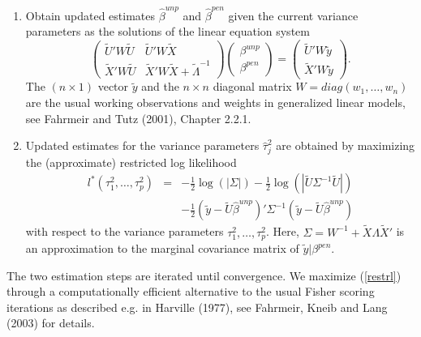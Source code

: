 \documentclass[11pt,a4paper,twoside]{bayesxarticle}
\begin{document}
\begin{enumerate}
\item Obtain updated estimates $\hat{\beta}^{unp}$ and $\hat{\beta}^{pen}$ given the current variance parameters
as the solutions of the linear equation system
\begin{equation}
\label{equsystem} \left(
\begin{array}{ll}
\tilde{U}' W  \tilde{U} & \tilde{U}' W  \tilde{X} \\
\tilde{X}' W  \tilde{U} & \tilde{X}' W  \tilde{X} +
\tilde{\Lambda}^{-1}
\end{array}
\right) \left(
\begin{array}{l}
\beta^{unp} \\
\beta^{pen}
\end{array}
\right) = \left(
\begin{array}{l}
\tilde{U}'W \tilde{y} \\
\tilde{X}'W \tilde{y}
\end{array}
\right).
\end{equation}
The $(n \times 1)$ vector $\tilde{y}$ and the $n \times n$
diagonal matrix $W = diag(w_1,\dots,w_n)$ are the usual working
observations and weights in generalized linear models, see
Fahrmeir and Tutz (2001), Chapter 2.2.1.
\item Updated estimates for the variance parameters $\hat{\tau}_j^2$ are obtained by maximizing
the (approximate) restricted log likelihood
\begin{equation}
\label{restrl}
\begin{array}{lll}
l^{\ast}(\tau^2_1,\dots,\tau^2_p) & = & -\frac{1}{2}
\log(|\Sigma|) - \frac{1}{2} \log(|\tilde{U} \Sigma^{-1}
\tilde{U}|) \\ [0.3cm] & & - \frac{1}{2} (\tilde{y} - \tilde{U}
\hat{\beta}^{unp})' \Sigma^{-1} (\tilde{y} - \tilde{U}
\hat{\beta}^{unp})
\end{array}
\end{equation}
with respect to the variance parameters $\tau^2_1,\dots,\tau^2_p$.
Here, $\Sigma = W^{-1} + \tilde{X} \Lambda \tilde{X}'$ is an
approximation to the marginal covariance matrix of $\tilde{y} |
\beta^{pen}$.
\end{enumerate}

The two estimation steps are iterated until convergence. We
maximize (\ref{restrl}) through a computationally efficient
alternative to the usual Fisher scoring iterations as described
e.g. in Harville (1977), see Fahrmeir, Kneib and Lang (2003) for
details.
\end{document}
